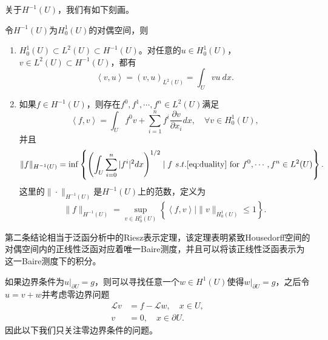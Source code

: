 \documentclass[a4paper,10pt]{ctexart}
\begin{document}
关于$ H^{-1}(U) $，我们有如下刻画。
\begin{theorem}
    令$ H^{-1}(U) $为$ H^1_0(U) $的对偶空间，则
    \begin{enumerate}
        \item $ H^1_0(U)\subset L^2(U)\subset H^{-1}(U) $。对任意的$ u\in H^1_0(U) $，$ v\in L^2(U)\subset H^{-1}(U) $，都有
        \begin{equation}
            \left<v,u\right> = (v,u)_{L^2(U)} = \int_U vu \ dx.
        \end{equation}
        \item 如果$ f\in H^{-1}(U) $，则存在$ f^0,f^1,\cdots ,f^n\in L^2(U) $满足
        \begin{equation}\label{eq:duality}
            \left<f,v\right> = \int_U f^0v + \sum_{i=1}^n f^i\frac{\partial v}{\partial x_i} dx,\quad \forall v\in H^1_0(U),
        \end{equation}
        并且
        \begin{equation}
            \| f \|_{H^{-1}(U)} = \inf \left\{ \left( \int_U \sum_{i=0}^n |f^i|^2dx \right)^{1 / 2}\mid f\ s.t. \eqref{eq:duality} \text{ for } f^0,\cdots ,f^n\in L^2(U)  \right\}.
        \end{equation}
        这里的$ \| \cdot \|_{H^{-1}(U)} $是$ H^{-1}(U) $上的范数，定义为
        \begin{equation}
            \| f \|_{H^{-1}(U)} = \sup_{v\in H^1_0(U)} \left\{ \left<f,v\right> \mid \| v \|_{H^1_0(U)} \leqslant 1 \right\} .
        \end{equation}
    \end{enumerate}
\end{theorem}
\noindent 第二条结论相当于泛函分析中的Riesz表示定理，该定理表明紧致Housedorff空间的对偶空间内的正线性泛函对应着唯一Baire测度，并且可以将该正线性泛函表示为这一Baire测度下的积分。

如果边界条件为$ u|_{\partial U} = g $，则可以寻找任意一个$ w\in H^1(U) $使得$ w|_{\partial U} = g $，之后令$ u = v+w $并考虑零边界问题
\[
    \begin{aligned}
        \mathcal{L}v &= f - \mathcal{L}w, \quad x\in U,\\
        v &= 0, \quad x\in \partial U.
    \end{aligned}
\]
因此以下我们只关注零边界条件的问题。
\end{document}
